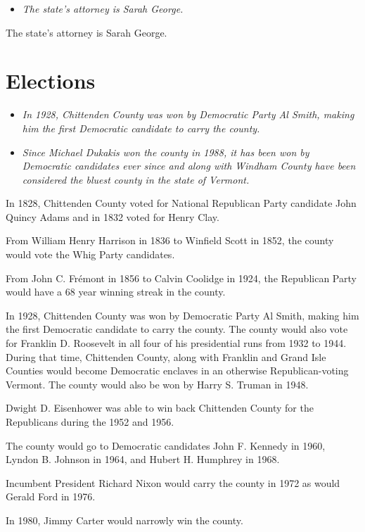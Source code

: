 \begin{itemize}
\item
  \emph{The state's attorney is Sarah George.}
\end{itemize}

The state's attorney is Sarah George.

\section{Elections}\label{elections}

\begin{itemize}
\item
  \emph{In 1928, Chittenden County was won by Democratic Party Al Smith,
  making him the first Democratic candidate to carry the county.}
\item
  \emph{Since Michael Dukakis won the county in 1988, it has been won by
  Democratic candidates ever since and along with Windham County have
  been considered the bluest county in the state of Vermont.}
\end{itemize}

In 1828, Chittenden County voted for National Republican Party candidate
John Quincy Adams and in 1832 voted for Henry Clay.

From William Henry Harrison in 1836 to Winfield Scott in 1852, the
county would vote the Whig Party candidates.

From John C. Frémont in 1856 to Calvin Coolidge in 1924, the Republican
Party would have a 68 year winning streak in the county.

In 1928, Chittenden County was won by Democratic Party Al Smith, making
him the first Democratic candidate to carry the county. The county would
also vote for Franklin D. Roosevelt in all four of his presidential runs
from 1932 to 1944. During that time, Chittenden County, along with
Franklin and Grand Isle Counties would become Democratic enclaves in an
otherwise Republican-voting Vermont. The county would also be won by
Harry S. Truman in 1948.

Dwight D. Eisenhower was able to win back Chittenden County for the
Republicans during the 1952 and 1956.

The county would go to Democratic candidates John F. Kennedy in 1960,
Lyndon B. Johnson in 1964, and Hubert H. Humphrey in 1968.

Incumbent President Richard Nixon would carry the county in 1972 as
would Gerald Ford in 1976.

In 1980, Jimmy Carter would narrowly win the county.

